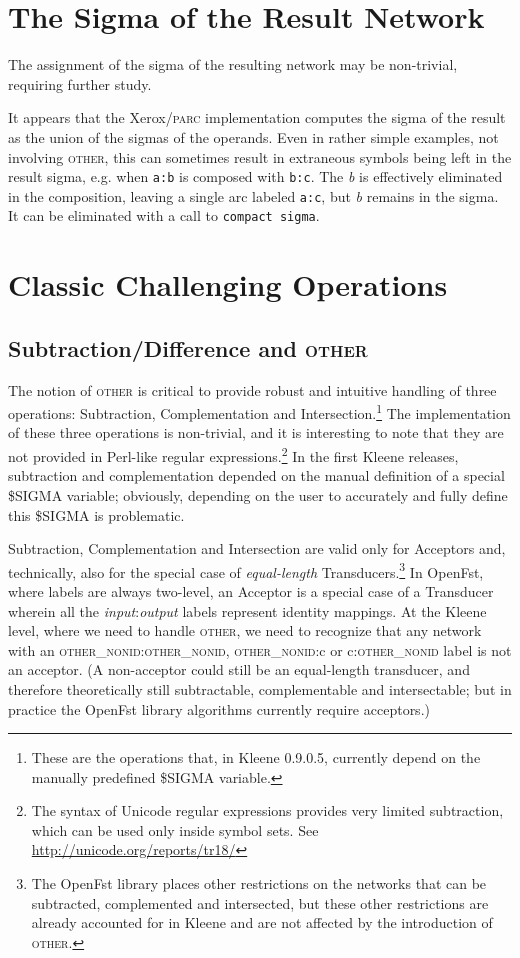 \documentclass[letterpaper,11pt]{article}
\providecommand{\acro}{}\renewcommand{\acro}{\textsc}
\begin{document}
\section{The Sigma of the Result Network}

The assignment of the sigma of the resulting network may be
non-trivial, requiring further study.

It appears that the Xerox/\acro{parc} implementation computes the
sigma of the result as the union of the sigmas of the operands.
Even in rather simple examples, not involving \acro{other}, this 
can sometimes result in extraneous symbols being left in the
result sigma, e.g. when \texttt{a:b} is composed with \texttt{b:c}.
The \emph{b} is effectively eliminated in the composition, leaving a
single arc labeled \texttt{a:c}, but \emph{b} remains in the sigma.
It can be eliminated with a call to \texttt{compact~sigma}.

\section{Classic Challenging Operations}

\subsection{Subtraction/Difference and \acro{other}}

The notion of \acro{other} is critical to provide robust  and intuitive 
handling of three operations:
Subtraction, Complementation and Intersection.\footnote{These are
the operations that, in Kleene 0.9.0.5, currently depend on the
manually
predefined \$SIGMA variable.}  The implementation of these three
operations is non-trivial, and it is interesting to note that they are not provided in Perl-like
regular expressions.\footnote{The syntax of Unicode regular expressions provides very limited
subtraction, which can be used only inside symbol sets.  See
\url{http://unicode.org/reports/tr18/}}  
In the first Kleene releases, subtraction and complementation depended on the
manual definition of a special \$SIGMA variable; obviously, depending on the user to
accurately and fully define this \$SIGMA is problematic.

Subtraction, Complementation and Intersection are valid only for
Acceptors and, technically, also for the
special case of \emph{equal-length} Transducers.\footnote{The OpenFst library places other
restrictions on the networks that can be subtracted, complemented and intersected, but these
other restrictions are already accounted for in Kleene and are not affected by the
introduction of \acro{other}.}  In OpenFst, where labels are always
two-level, an Acceptor is a special case of a
Transducer wherein all the \emph{input}:\emph{output} labels represent identity mappings.  At
the Kleene level, where we need to handle \acro{other}, we need to recognize that any network with an
\acro{other\_nonid}:\acro{other\_nonid}, \acro{other\_nonid}:c or c:\acro{other\_nonid} label
is not an acceptor.  (A non-acceptor could still be
an equal-length transducer, and therefore theoretically still subtractable,
complementable and intersectable; but in practice the OpenFst library
algorithms currently require acceptors.)
\end{document}
